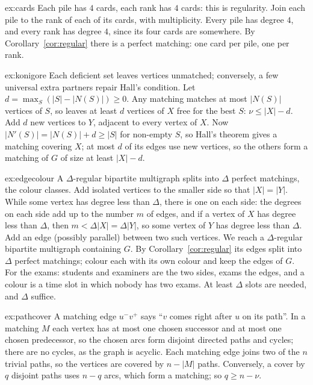 \begin{solution}{ex:cards}
\idea Each pile has $4$ cards, each rank has $4$ cards: this is regularity.
\writeup Join each pile to the rank of each of its cards, with multiplicity. Every pile has degree $4$, and every rank has degree $4$, since its four
cards are somewhere. By Corollary~\ref{cor:regular} there is a perfect matching: one card per pile, one per rank.
\end{solution}

\begin{solution}{ex:konigore}
\idea Each deficient set leaves vertices unmatched; conversely, a few universal extra partners repair Hall's condition.
\writeup Let $d=\max_S(|S|-|N(S)|)\ge0$. Any matching matches at most $|N(S)|$ vertices of $S$, so leaves at least $d$ vertices of $X$ free for the best $S$:
$\nu\le|X|-d$. Add $d$ new vertices to $Y$, adjacent to every vertex of $X$. Now $|N'(S)|=|N(S)|+d\ge|S|$ for non-empty $S$, so Hall's theorem gives a matching covering $X$;
at most $d$ of its edges use new vertices, so the others form a matching of $G$ of size at least $|X|-d$.
\end{solution}

\begin{solution}{ex:edgecolour}
\idea A $\Delta$-regular bipartite multigraph splits into $\Delta$ perfect matchings, the colour classes.
\writeup Add isolated vertices to the smaller side so that $|X|=|Y|$. While some vertex has degree less than $\Delta$, there is one on each side: the degrees on each side add up to the number $m$ of edges, and if a vertex of $X$ has degree
less than $\Delta$, then $m<\Delta|X|=\Delta|Y|$, so some vertex of $Y$ has degree less than $\Delta$. Add an edge (possibly parallel) between two such
vertices. We reach a $\Delta$-regular bipartite multigraph containing $G$. By Corollary~\ref{cor:regular} its
edges split into $\Delta$ perfect matchings; colour each with its own colour and keep the edges of $G$. For the exams: students and examiners are the two
sides, exams the edges, and a colour is a time slot in which nobody has two exams. At least $\Delta$ slots are needed, and $\Delta$ suffice.
\end{solution}

\begin{solution}{ex:pathcover}
\idea A matching edge $u^-v^+$ says ``$v$ comes right after $u$ on its path''.
\writeup In a matching $M$ each vertex has at most one chosen successor and at most one chosen predecessor, so the chosen arcs form disjoint
directed paths and cycles; there are no cycles, as the graph is acyclic. Each matching edge joins two of the $n$ trivial paths, so the
vertices are covered by $n-|M|$ paths. Conversely, a cover by $q$ disjoint paths uses $n-q$ arcs, which form a matching; so $q\ge n-\nu$.
\end{solution}

